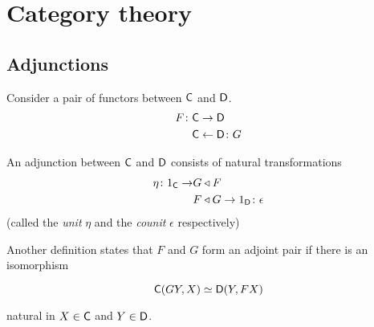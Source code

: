 \chapter{Category theory}

\section{Adjunctions}

Consider a pair of functors between $\mathsf{C}$ and $\mathsf{D}$.
\begin{align*}
  F \colon &\mathsf{C} \to        \mathsf{D}\\
           &\mathsf{C} \leftarrow \mathsf{D} \colon G
\end{align*}

An adjunction between $\mathsf{C}$ and $\mathsf{D}$ consists of natural transformations
\begin{align*}
  \eta \colon 1_{\mathsf{C}} \to &G\triangleleft F\\
                        &F\triangleleft G \to 1_{\mathsf{D}} \colon \epsilon
\end{align*}
(called the \emph{unit} $\eta$ and the \emph{counit} $\epsilon$ respectively)

Another definition states that $F$ and $G$ form an adjoint pair if there is an
isomorphism

\[ \mathsf{C}(GY, X) \simeq \mathsf{D}(Y, FX) \]

natural in $X\in\mathsf{C}$ and $Y\in\mathsf{D}$.